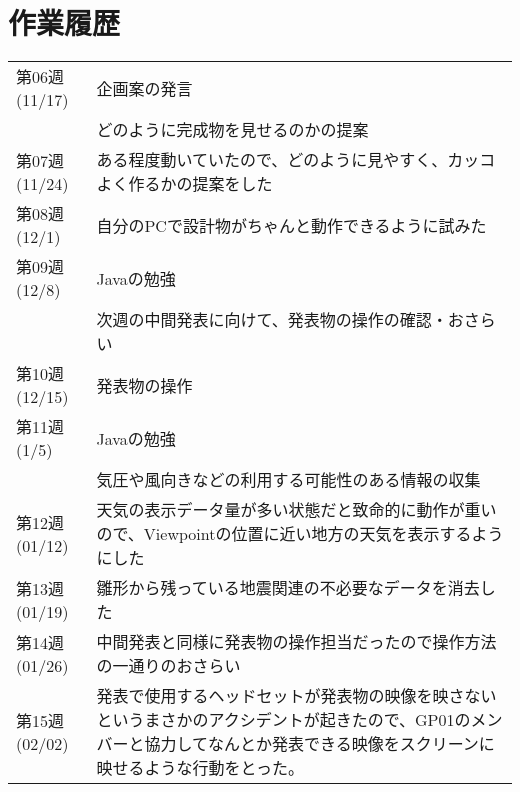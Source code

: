 \documentclass[a4j]{jarticle}
\begin{document}
\section{作業履歴}
\begin{center}
\renewcommand{\arraystretch}{1.4}
\begin{tabular}{|p{25mm}|p{125mm}|}\hline


第06週(11/17) & 企画案の発言 \\\cline{2-2}    %
			　& どのように完成物を見せるのかの提案 \\\hline
  
第07週(11/24) & ある程度動いていたので、どのように見やすく、カッコよく作るかの提案をした \\\hline    
              
第08週(12/1) & 自分のPCで設計物がちゃんと動作できるように試みた \\\hline
第09週(12/8) & Javaの勉強 \\\cline{2-2}
			& 次週の中間発表に向けて、発表物の操作の確認・おさらい \\\hline
第10週(12/15) & 発表物の操作 \\\hline
第11週(1/5) & Javaの勉強 \\\cline {2-2}
			& 気圧や風向きなどの利用する可能性のある情報の収集 \\\hline 
第12週(01/12) & 天気の表示データ量が多い状態だと致命的に動作が重いので、Viewpointの位置に近い地方の天気を表示するようにした\\\hline
第13週(01/19) & 雛形から残っている地震関連の不必要なデータを消去した \\\hline
第14週(01/26) & 中間発表と同様に発表物の操作担当だったので操作方法の一通りのおさらい\\\hline
第15週(02/02) & 発表で使用するヘッドセットが発表物の映像を映さないというまさかのアクシデントが起きたので、GP01のメンバーと協力してなんとか発表できる映像をスクリーンに映せるような行動をとった。 \\\hline 


\end{tabular}
\end{center}
\end{document}
